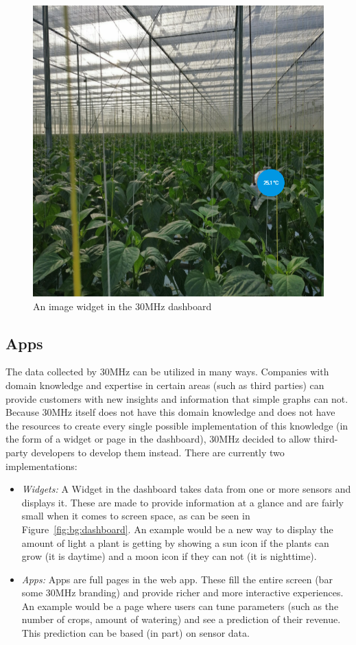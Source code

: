 \begin{figure}[h]
  \includegraphics[width=\columnwidth]{figures/background/dashboard-img.png}
  \caption{An image widget in the 30MHz dashboard}
  \label{fig:bg:dashboard-img}
  \centering
\end{figure}

\subsection{Apps}\label{sec:bg:apps}
The data collected by 30MHz can be utilized in many ways. Companies with domain knowledge and expertise in certain areas (such as third parties) can provide customers with new insights and information that simple graphs can not. Because 30MHz itself does not have this domain knowledge and does not have the resources to create every single possible implementation of this knowledge (in the form of a widget or page in the dashboard), 30MHz decided to allow third-party developers to develop them instead. There are currently two implementations:

\begin{itemize}
  \item \emph{Widgets:} A Widget in the dashboard takes data from one or more sensors and displays it. These are made to provide information at a glance and are fairly small when it comes to screen space, as can be seen in Figure~\ref{fig:bg:dashboard}. An example would be a new way to display the amount of light a plant is getting by showing a sun icon if the plants can grow (it is daytime) and a moon icon if they can not (it is nighttime).
  \item \emph{Apps:} Apps are full pages in the web app. These fill the entire screen (bar some 30MHz branding) and provide richer and more interactive experiences. An example would be a page where users can tune parameters (such as the number of crops, amount of watering) and see a prediction of their revenue. This prediction can be based (in part) on sensor data.
\end{itemize}

